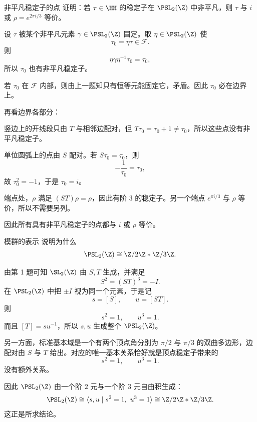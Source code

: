 \begin{problem}{非平凡稳定子的点}
\hard
证明：若 $\tau\in\HH$ 的稳定子在 $\PSL_2(\Z)$ 中非平凡，则 $\tau$ 与 $i$ 或 $\rho=e^{2\pi i/3}$ 等价。
\end{problem}
\begin{solution}
设 $\tau$ 被某个非平凡元素 $\gamma\in\PSL_2(\Z)$ 固定。取 $\eta\in\PSL_2(\Z)$ 使
\[
\tau_0=\eta\tau\in\mathcal{F}.
\]
则
\[
\eta\gamma\eta^{-1}\tau_0=\tau_0,
\]
所以 $\tau_0$ 也有非平凡稳定子。

若 $\tau_0$ 在 $\mathcal{F}$ 内部，则由上一题知只有恒等元能固定它，矛盾。因此 $\tau_0$ 必在边界上。

再看边界各部分：

竖边上的开线段只由 $T$ 与相邻边配对，但 $T\tau_0=\tau_0+1\neq\tau_0$，所以这些点没有非平凡稳定子。

单位圆弧上的点由 $S$ 配对。若 $S\tau_0=\tau_0$，则
\[
-\frac1{\tau_0}=\tau_0,
\]
故 $\tau_0^2=-1$，于是 $\tau_0=i$。

端点处，$\rho$ 满足 $(ST)\rho=\rho$，因此有阶 $3$ 的稳定子。另一个端点 $e^{\pi i/3}$ 与 $\rho$ 等价，所以不需要另列。

因此所有具有非平凡稳定子的点都与 $i$ 或 $\rho$ 等价。
\end{solution}

\begin{problem}{模群的表示}
\hard
说明为什么
\[
\PSL_2(\Z)\cong \Z/2\Z * \Z/3\Z.
\]
\end{problem}
\begin{solution}
由第 1 题可知 $\SL_2(\Z)$ 由 $S,T$ 生成，并满足
\[
S^2=(ST)^3=-I.
\]
在 $\PSL_2(\Z)$ 中把 $\pm I$ 视为同一个元素，于是记
\[
s=[S],\qquad u=[ST].
\]
则
\[
s^2=1,\qquad u^3=1.
\]
而且 $[T]=su^{-1}$，所以 $s,u$ 生成整个 $\PSL_2(\Z)$。

另一方面，标准基本域是一个有两个顶点角分别为 $\pi/2$ 与 $\pi/3$ 的双曲多边形，边配对由 $S$ 与 $T$ 给出。对应的唯一基本关系恰好就是顶点稳定子带来的
\[
s^2=1,\qquad u^3=1.
\]
没有额外关系。

因此 $\PSL_2(\Z)$ 由一个阶 $2$ 元与一个阶 $3$ 元自由积生成：
\[
\PSL_2(\Z)\cong \langle s,u\mid s^2=1,\ u^3=1\rangle
\cong \Z/2\Z * \Z/3\Z.
\]
这正是所求结论。
\end{solution}

